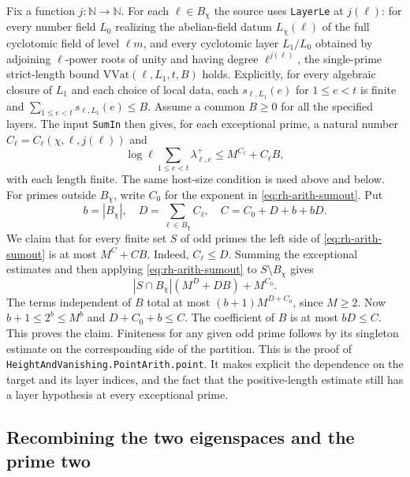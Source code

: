 Fix a function \(j:\mathbb N\to\mathbb N\). For each
\(\ell\in B_\chi\) the source uses \texttt{Layer\allowbreak{}Le} at \(j(\ell)\):
for every number field \(L_0\) realizing the abelian-field datum
\(L_\chi(\ell)\) of the full cyclotomic field of level \(\ell m\),
and every cyclotomic layer \(L_1/L_0\) obtained by
adjoining \(\ell\)-power roots of unity and having degree
\(\ell^{j(\ell)}\), the single-prime strict-length bound
\(\mathrm{VVat}(\ell,L_1,t,B)\) holds. Explicitly, for every
algebraic closure of \(L_1\) and each choice of local data, each
\(s_{\ell,L_1}(e)\) for \(1\le e<t\) is finite and
\(\sum_{1\le e<t}s_{\ell,L_1}(e)\le B\). Assume a common \(B\ge0\)
for all the specified layers. The input \texttt{Sum\allowbreak{}In} then gives,
for each exceptional prime, a natural number
\(C_\ell=C_\ell(\chi,\ell,j(\ell))\) and
\[
       \log\ell\sum_{1\le e<t}\lambda^+_{\ell,e}
                   \le M^{C_\ell}+C_\ell B,
\]
with each length finite. The same host-size condition is used above and
below. For primes outside \(B_\chi\), write \(C_0\) for the exponent
in \eqref{eq:rh-arith-sumout}. Put
\[
       b=|B_\chi|,\quad D=\sum_{\ell\in B_\chi}C_\ell,\quad
       C=C_0+D+b+bD .
\]
We claim that for every finite set \(S\) of odd primes the left side
of \eqref{eq:rh-arith-sumout} is at most \(M^C+CB\).
Indeed, \(C_\ell\le D\). Summing the exceptional estimates and then
applying \eqref{eq:rh-arith-sumout} to \(S\setminus B_\chi\) gives
\[
     |S\cap B_\chi|(M^D+DB)+M^{C_0}.
\]
The terms independent of \(B\) total at most
\((b+1)M^{D+C_0}\), since \(M\ge2\). Now \(b+1\le2^b\le M^b\)
and \(D+C_0+b\le C\). The coefficient of \(B\) is at most \(bD\le C\).
This proves the claim. Finiteness for any given odd prime follows
by its singleton estimate on the corresponding side of the partition.
This is the proof of \texttt{Height\allowbreak{}And\allowbreak{}Vanishing.\allowbreak{}Point\allowbreak{}Arith.\allowbreak{}point}.
It makes explicit the dependence on the target and its layer indices,
and the fact that the positive-length estimate still has a layer
hypothesis at every exceptional prime.

\subsection{Recombining the two eigenspaces and the prime two}

